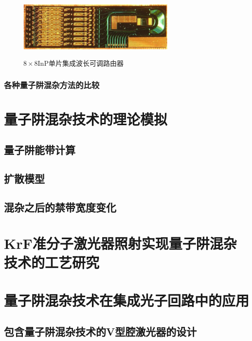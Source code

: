 \documentclass{ZJUthesis}
\begin{document}
\begin{figure}[htb]
  \centering
  \includegraphics[width=0.7\textwidth]{./Pictures/motor.eps}\\
  \caption{$8\times8$InP单片集成波长可调路由器}
  \label{fig_motor}
\end{figure}

\subsection{各种量子阱混杂方法的比较}

\chapter{量子阱混杂技术的理论模拟}

\section{量子阱能带计算}

\section{扩散模型}

\section{混杂之后的禁带宽度变化}

\chapter{KrF准分子激光器照射实现量子阱混杂技术的工艺研究}




\chapter{量子阱混杂技术在集成光子回路中的应用}

\section{包含量子阱混杂技术的V型腔激光器的设计}
\end{document}
